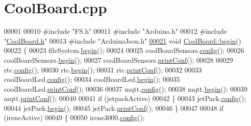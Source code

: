 \hypertarget{_cool_board_8cpp_source}{}\section{Cool\+Board.\+cpp}

\begin{DoxyCode}
00001 
00010 \textcolor{preprocessor}{#include "FS.h"}
00011 \textcolor{preprocessor}{#include "Arduino.h"}
00012 \textcolor{preprocessor}{#include "\hyperlink{_cool_board_8h}{CoolBoard.h}"}
00013 \textcolor{preprocessor}{#include "ArduinoJson.h"}
\hyperlink{class_cool_board_acba7c5aef7268b2c0044bdb54d3b9d76}{00021} \textcolor{keywordtype}{void} \hyperlink{class_cool_board_acba7c5aef7268b2c0044bdb54d3b9d76}{CoolBoard::begin}()
00022 \{
00023     fileSystem.\hyperlink{class_cool_file_system_a6ba6f666ed4c530174f8569d2c636748}{begin}();
00024     
00025     coolBoardSensors.\hyperlink{class_cool_board_sensors_a9a218895c5423375c33c08f2c56fb23a}{config}();
00026     coolBoardSensors.\hyperlink{class_cool_board_sensors_a97095823ef7c8f5290812f1405b966b3}{begin}();
00027     coolBoardSensors.\hyperlink{class_cool_board_sensors_af6fd79505815b204c178617ecf54c873}{printConf}();
00028 
00029     rtc.\hyperlink{class_cool_time_a87c28260c1bc77091162cbcf1ee2e129}{config}();
00030     rtc.\hyperlink{class_cool_time_ab1976cf718b950bc31e003c3323b8adb}{begin}();
00031     rtc.\hyperlink{class_cool_time_af355e7f9b3898211cd2ff25eab5933b1}{printConf}();
00032 
00033     coolBoardLed.\hyperlink{class_cool_board_led_a1b60e5e30bea96c49ed62ed1bf1ffc8b}{config}();
00034     coolBoardLed.\hyperlink{class_cool_board_led_ae3cbde8affcc6f011cbd698c8ef911f6}{begin}();
00035     coolBoardLed.\hyperlink{class_cool_board_led_a8ed3053a36f0ed4a131f43b5b17efb61}{printConf}();
00036 
00037     mqtt.\hyperlink{class_cool_m_q_t_t_a9b703de4f1358f0ee7a5e8c44979c648}{config}();
00038     mqtt.\hyperlink{class_cool_m_q_t_t_ac9248808641ebf3054ed0620ea9d0100}{begin}();
00039     mqtt.\hyperlink{class_cool_m_q_t_t_a40553a0ad4b5ecf1cb4411ab54ca85fb}{printConf}();
00040 
00041     \textcolor{keywordflow}{if} (jetpackActive)
00042     \{
00043         jetPack.\hyperlink{class_jetpack_ab065ee83e244265a2223a22f3ee4a719}{config}();
00044         jetPack.\hyperlink{class_jetpack_a5a53e1ebf7aaf3bf3e0d37ea64ca09a7}{begin}();
00045         jetPack.\hyperlink{class_jetpack_ac54a7bb4f9166bee32052253d9b1d306}{printConf}();
00046     \}
00047 
00048     \textcolor{keywordflow}{if} (ireneActive)
00049     \{
00050         irene3000.\hyperlink{class_irene3000_afed5c35e4b23963c157847ef27c11e9c}{config}();

\end{DoxyCode}
